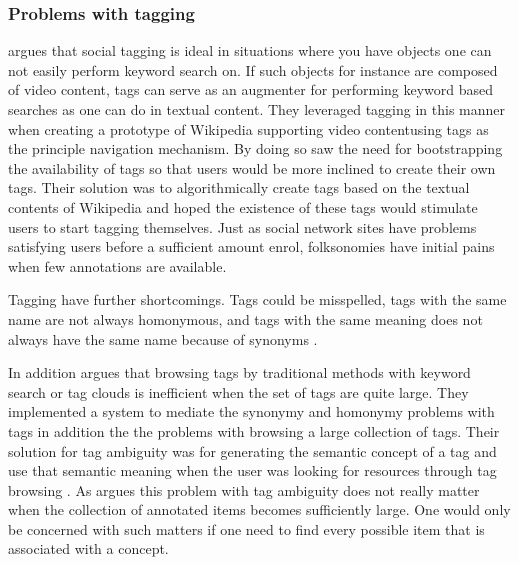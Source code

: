 \subsubsection{Problems with tagging}

\citet[]{fokker06} argues that social tagging is ideal in situations
where you have objects one can not easily perform keyword search on.
If such objects for instance are composed of video content, tags
can serve as an augmenter for performing keyword based searches as one can
do in textual content. They leveraged tagging in this manner when creating a
prototype of Wikipedia supporting video content\dash{}using tags as the
principle navigation mechanism. By doing so \citet[]{fokker06}
saw the need for bootstrapping the availability of tags so that users would be
more inclined to create their own tags. Their solution was to algorithmically
create tags based on the textual contents of Wikipedia and hoped the existence
of these tags would stimulate users to start tagging themselves. Just as
social network sites have problems satisfying users before a
sufficient amount enrol, folksonomies have initial pains when
few annotations are available.

Tagging have further shortcomings. Tags could be misspelled, tags with the
same name are not always  homonymous, and tags with the same meaning does not
always have the same name because of synonyms \citep[]{aurnhammer06}.

In addition \citet[]{li07} argues that browsing tags by traditional
methods with keyword search or tag clouds is inefficient when the set of tags
are quite large. They implemented a system to mediate the synonymy and
homonymy problems with tags in addition the the problems with browsing a large
collection of tags. Their solution for tag ambiguity
was for generating the semantic concept%
of a tag and use that semantic meaning
when the user was looking for resources through tag browsing
\citep[]{li07}.
As \citet[]{weinberger07} argues this problem
with tag ambiguity does not really matter when the collection of annotated
items becomes sufficiently large. One would only be concerned with such
matters if one need to find every possible item that is associated with a
concept.

